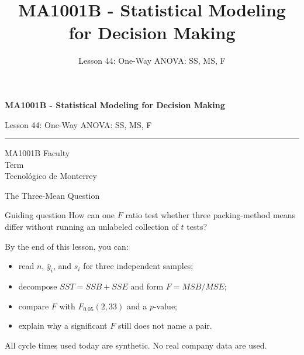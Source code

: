 \documentclass[aspectratio=169,10pt,english]{beamer}
\title{MA1001B - Statistical Modeling for Decision Making}
\subtitle{Lesson 44: One-Way ANOVA: SS, MS, F}
\author{}
\institute{Tecnol\'ogico de Monterrey}
\date{}
\begin{document}
\begin{frame}[plain]
  \vspace{1.2cm}
  {\Large\bfseries MA1001B - Statistical Modeling for Decision Making\par}
  \vspace{0.7cm}
  {\large Lesson 44: One-Way ANOVA: SS, MS, F\par}
  \vspace{0.7cm}
  {\color{TecRojo}\rule{\textwidth}{1.2pt}}
  \vspace{0.8cm}

  MA1001B Faculty\\[0.3cm]
  Term\\[0.3cm]
  Tecnol\'ogico de Monterrey
\end{frame}

\begin{frame}{The Three-Mean Question}
  \begin{alertblock}{Guiding question}
    How can one $F$ ratio test whether three packing-method means differ
    without running an unlabeled collection of $t$ tests?
  \end{alertblock}

  \vspace{0.6em}
  By the end of this lesson, you can:
  \begin{itemize}
    \item read $n$, $\bar y_i$, and $s_i$ for three independent samples;
    \item decompose $SST=SSB+SSE$ and form $F=MSB/MSE$;
    \item compare $F$ with $F_{0.05}(2,33)$ and a $p$-value;
    \item explain why a significant $F$ still does not name a pair.
  \end{itemize}

  \vfill
  \scriptsize All cycle times used today are synthetic. No real company data are used.
\end{frame}
\end{document}
